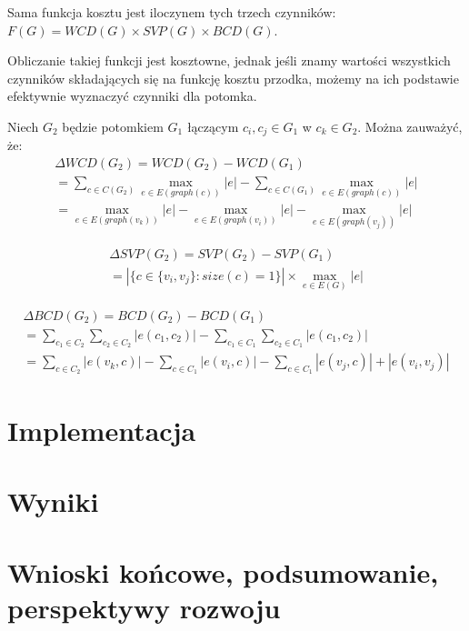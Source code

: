 \documentclass[a4paper,10pt]{article}
\begin{document}
Sama funkcja kosztu jest iloczynem tych trzech czynników: $F(G) = WCD(G) \times SVP(G) \times BCD(G)$.

Obliczanie takiej funkcji jest kosztowne, jednak jeśli znamy wartości wszystkich czynników składających się na funkcję kosztu przodka, 
możemy na ich podstawie efektywnie wyznaczyć czynniki dla potomka.

Niech $G_2$ będzie potomkiem $G_1$ łączącym $c_i, c_j \in G_1$ w $c_k \in G_2$. Można zauważyć, że:
\begin{equation}
\begin{split}
 \Delta WCD(G_2) = WCD(G_2) - WCD(G_1)\\
 = \sum_{c \in C(G_2)} \max_{e \in E(graph(c))} |e| - \sum_{c \in C(G_1)} \max_{e \in E(graph(c))} |e|\\
 = \max_{e \in E(graph(v_k))} |e| - \max_{e \in E(graph(v_i))} |e| - \max_{e \in E(graph(v_j))} |e|
 \end{split}
\end{equation}

\begin{equation}
\begin{split}
 \Delta SVP(G_2) = SVP(G_2) - SVP(G_1)\\
 = |\{c \in \{v_i, v_j\} : size(c) = 1\}| \times \max_{e \in E(G)} |e|
 \end{split}
\end{equation}

\begin{equation}
\begin{split}
 \Delta BCD(G_2) = BCD(G_2) - BCD(G_1)\\
 = \sum_{c_1 \in C_2} \sum_{c_2 \in C_2} |e(c_1, c_2)| - \sum_{c_1 \in C_1} \sum_{c_2 \in C_1} |e(c_1, c_2)|\\
 = \sum_{c \in C_2} |e(v_k, c)| - \sum_{c \in C_1} |e(v_i, c)| - \sum_{c \in C_1} |e(v_j, c)| + |e(v_i, v_j)|
 \end{split}
\end{equation}

\section{Implementacja}
\section{Wyniki}
\section{Wnioski końcowe, podsumowanie, perspektywy rozwoju}
\end{document}
